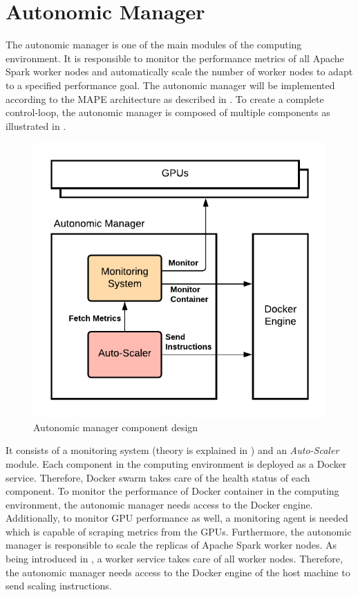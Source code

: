 \section{Autonomic Manager}
\label{05_am}
The autonomic manager is one of the main modules of the computing environment.
It is responsible to monitor the performance metrics of all Apache Spark worker nodes and automatically scale the number of worker nodes to adapt to a specified performance goal.
The autonomic manager will be implemented according to the MAPE architecture as described in . To create a complete control-loop, the autonomic manager is composed of multiple components as illustrated in .
\label{subsec:05_am}
\begin{figure}[h]
\centering
\includegraphics[scale=1]{images/05_conceptual_design/autonomic_manager/autonomic_manager_concept}
\caption{Autonomic manager component design}
\label{fig:05_am_concept}
\end{figure}
It consists of a monitoring system (theory is explained in ) and an \textit{Auto-Scaler} module.
Each component in the computing environment is deployed as a Docker service. Therefore, Docker swarm takes care of the health status of each component.
To monitor the performance of Docker container in the computing environment, the autonomic manager needs access to the Docker engine. Additionally, to monitor GPU performance as well, a monitoring agent is needed which is capable of scraping metrics from the GPUs.
Furthermore, the autonomic manager is responsible to scale the replicas of Apache Spark worker nodes. As being introduced in , a worker service takes care of all worker nodes. Therefore, the autonomic manager needs access to the Docker engine of the host machine to send scaling instructions.


